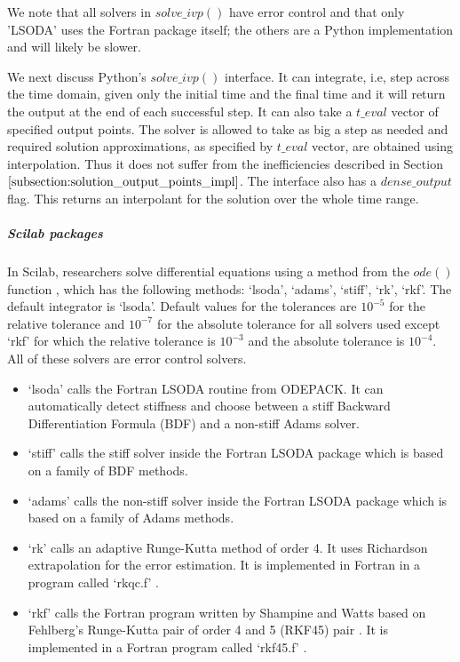 We note that all solvers in $solve\_ivp()$ have error control and that only 'LSODA' uses the Fortran package itself; the others are a Python implementation and will likely be slower.

We next discuss Python's $solve\_ivp()$ interface. It can integrate, i.e, step across the time domain, given only the initial time and the final time and it will return the output at the end of each successful step. It can also take a $t\_eval$ vector of specified output points. The solver is allowed to take as big a step as needed and required solution approximations, as specified by $t\_eval$ vector, are obtained using interpolation. Thus it does not suffer from the inefficiencies described in Section $\ref{subsection:solution_output_points_impl}$. The interface also has a $dense\_output$ flag. This returns an interpolant for the solution over the whole time range.

\subparagraph{Scilab packages}
In Scilab, researchers solve differential equations using a method from the $ode()$ function \cite{campbell2010modeling}, which has the following methods: `lsoda', `adams', `stiff', `rk', `rkf'. The default integrator is `lsoda'.
Default values for the tolerances are $10^{-5}$ for the relative tolerance and $10^{-7}$ for the absolute tolerance for all solvers used except `rkf' for which the relative tolerance is $10^{-3}$ and the absolute tolerance is $10^{-4}$. All of these solvers are error control solvers.

\begin{itemize}
\item `lsoda' calls the Fortran LSODA routine from ODEPACK. It can automatically detect stiffness and choose between a stiff Backward Differentiation Formula (BDF) and a non-stiff Adams solver.

\item `stiff' calls the stiff solver inside the Fortran LSODA package which is based on a family of BDF methods.

\item `adams' calls the non-stiff solver inside the Fortran LSODA package which is based on a family of Adams methods.

\item `rk' calls an adaptive Runge-Kutta method of order 4. It uses Richardson extrapolation \cite{MR1261869} for the error estimation. It is implemented in Fortran in a program called `rkqc.f' \cite{scilabGithub}.

\item `rkf' calls the Fortran program written by Shampine and Watts based on Fehlberg's Runge-Kutta pair of order 4 and 5 (RKF45) pair \cite{osti7318812}. It is implemented in a Fortran program called `rkf45.f' \cite{scilabGithub}.
\end{itemize}


